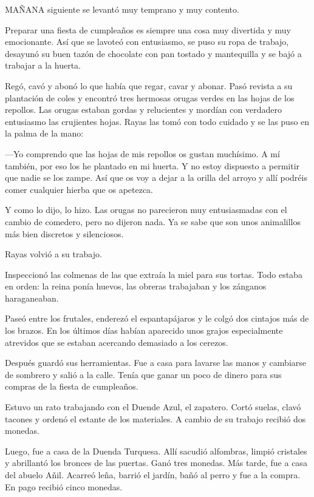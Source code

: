 \documentclass{barcodevapor3pags}
\begin{document}
\capitulo

 MAÑANA siguiente se levantó muy temprano y muy contento.

Preparar una fiesta de cumpleaños es siempre una cosa muy divertida y
muy emocionante. Así que se lavoteó con entusiasmo, se puso su ropa de
trabajo, desayunó su buen tazón de chocolate con pan tostado y
mantequilla y se bajó a trabajar a la huerta.

Regó, cavó y abonó lo que había que regar, cavar y abonar. Pasó revista
a su plantación de coles y encontró tres hermosas orugas verdes en las
hojas de los repollos. Las orugas estaban gordas y relucientes y mordían
con verdadero entusiasmo las crujientes hojas. Rayas las tomó con todo
cuidado y se las puso en la palma de la mano:

---Yo comprendo que las hojas de mis repollos os gustan muchísimo. A mí
también, por eso los he plantado en mi huerta. Y no estoy dispuesto a
permitir que nadie se los zampe. Así que os voy a dejar a la orilla del
arroyo y allí podréis comer cualquier hierba que os apetezca.

Y como lo dijo, lo hizo. Las orugas no parecieron muy entusiasmadas con
el cambio de comedero, pero no dijeron nada. Ya se sabe que son unos
animalillos más bien discretos y silenciosos.

Rayas volvió a su trabajo.

Inspeccionó las colmenas de las que extraía la miel para sus tortas.
Todo estaba en orden: la reina ponía huevos, las obreras trabajaban y
los zánganos haraganeaban.

Paseó entre los frutales, enderezó el espantapájaros y le colgó dos
cintajos más de los brazos. En los últimos días habían aparecido unos
grajos especialmente atrevidos que se estaban acercando demasiado a los
cerezos.

Después guardó sus herramientas. Fue a casa para lavarse las manos y
cambiarse de sombrero y salió a la calle. Tenía que ganar un poco de
dinero para sus compras de la fiesta de cumpleaños.

Estuvo un rato trabajando con el Duende Azul, el zapatero. Cortó suelas,
clavó tacones y ordenó el estante de los materiales. A cambio de su
trabajo recibió dos monedas.

Luego, fue a casa de la Duenda Turquesa. Allí sacudió alfombras, limpió
cristales y abrillantó los bronces de las puertas. Ganó tres monedas.
Más tarde, fue a casa del abuelo Añil. Acarreó leña, barrió el jardín,
bañó al perro y fue a la compra. En pago recibió cinco monedas.
\end{document}
